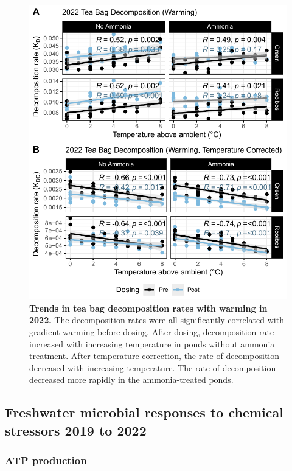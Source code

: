 \documentclass[11pt, a4paper]{article}
\begin{document}
\begin{spacing}{1.5}
\begin{figure}[H]
    \centering
    \includegraphics[scale=1]{./Figures/Regression_Tea}
    \caption{\textbf{Trends in tea bag decomposition rates with warming in 2022.} The decomposition rates were all significantly correlated with gradient warming before dosing. After dosing, decomposition rate increased with increasing temperature in ponds without ammonia treatment. After temperature correction, the rate of decomposition decreased with increasing temperature. The rate of decomposition decreased more rapidly in the ammonia-treated ponds.}
    \label{fig:Tea2022Regression}
\end{figure}

\subsection{Freshwater microbial responses to chemical stressors 2019 to 2022}

\subsubsection{ATP production}


\end{spacing}
\end{document}

